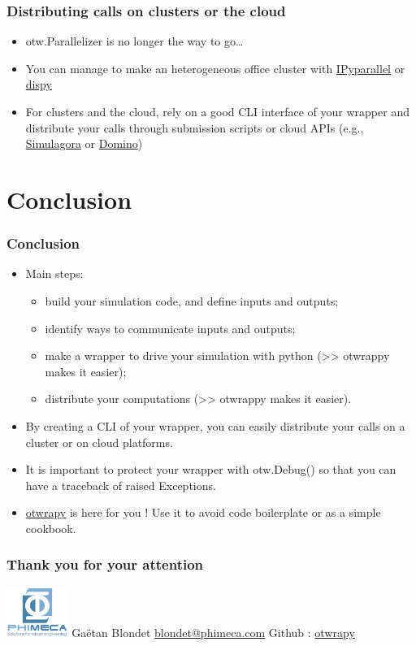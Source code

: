 \documentclass[10pt, aspectratio=169]{beamer}
\begin{document}
\begin{frame}
\frametitle{Distributing calls on clusters or the cloud}
\begin{itemize}
\item otw.Parallelizer is no longer the way to go\ldots{}
\item You can manage to make an heterogeneous office cluster with \href{http://ipyparallel.readthedocs.io/en/latest/}{IPyparallel} or \href{http://dispy.sourceforge.net/}{dispy}
\item For clusters and the cloud, rely on a good CLI interface of your
  wrapper and distribute your calls through submission scripts or
  cloud APIs (e.g., \href{https://www.simulagora.com/}{Simulagora} or \href{https://www.dominodatalab.com/}{Domino})
\end{itemize}
\end{frame}


\section{Conclusion}
\label{sec-8}
\begin{frame}
\frametitle{Conclusion}
\begin{itemize}
\item Main steps:
\begin{itemize}
	\item build your simulation code, and define inputs and outputs;
	\item identify ways to communicate inputs and outputs;
	\item make a wrapper to drive your simulation with python (>> otwrappy makes it easier);
	\item distribute your computations (>> otwrappy makes it easier).
\end{itemize}

\item By creating a CLI of your wrapper, you can easily distribute your calls on a cluster or on cloud platforms.
\item It is important to protect your wrapper with otw.Debug() so that you can have a traceback of raised Exceptions.

\item \href{http://openturns.github.io/otwrapy/master/index.html}{otwrapy} is here for you ! Use it to avoid code boilerplate or as a simple cookbook.
\end{itemize}
\end{frame}


\begin{frame}
\frametitle{Thank you for your attention}

\begin{center}
\includegraphics[width=0.15\textwidth]{./figure/LogoPhiHaut-white.png}
\vfill
Gaëtan Blondet
\vfill
\href{mailto:blondet@phimeca.com}{blondet@phimeca.com}
\vfill
Github : \href{http://openturns.github.io/otwrapy/master/index.html}{otwrapy}
\end{center}
\end{frame}
\end{document}

